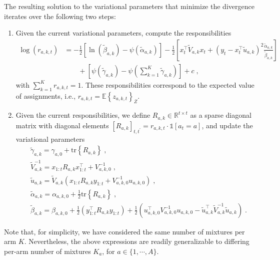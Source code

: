\documentclass{article}
\def \Real{{\mathbb R}}
\newcommand{\eValue}[1]{\mathbb{E}\left\{ #1 \right\}}
\newcommand{\ie}{i.e., }
\newcommand{\tr}[1]{\mathrm{tr}\left\{ #1 \right\}} %
\begin{document}
\pagebreak
The resulting solution to the variational parameters that minimize the divergence iterates over the following two steps:
\begin{enumerate}
	\item Given the current variational parameters, compute the responsibilities
		\begin{equation}
		\begin{split}
		\log (r_{a,k,t}) &= -\frac{1}{2} \left[\ln\left(\widetilde{\beta}_{a,k}\right) - \psi \left(\widetilde{\alpha}_{a,k}\right)\right] -\frac{1}{2} \left[x_t^\top \widetilde{V}_{a,k} x_t + (y_t-x_t^\top \widetilde{u}_{a,k})^2\frac{\widetilde{\alpha}_{a,k}}{\widetilde{\beta}_{a,k}}\right] \\
		& \qquad  + \left[\psi(\widetilde{\gamma}_{a,k})- \psi\left(\sum_{k=1}^K\widetilde{\gamma}_{a,k}\right)\right] + c \;,
		\end{split}
		\end{equation}
		with $\sum_{k=1}^K r_{a,k,t} = 1$. These responsibilities correspond to the expected value of assignments, \ie $r_{a,k,t}=\eValue{z_{a,k,t}}_{Z}$.
	\item Given the current responsibilities, we define $R_{a,k}\in\Real^{t\times t}$ as a sparse diagonal matrix with diagonal elements $\left[R_{a,k}\right]_{t,t^\prime}=r_{a,k,t} \cdot \mathds{1}[a_t=a]$, and update the variational parameters
		\begin{equation}
		\begin{split}
		&\widetilde{\gamma}_{a,k}=\gamma_{a,0} + \tr{R_{a,k}} \;, \\
		&\widetilde{V}_{a,k}^{-1} = x_{1:t} R_{a,k} x_{1:t}^\top + V_{a,k,0}^{-1} \;,\\
		&\widetilde{u}_{a,k}= \widetilde{V}_{a,k} \left( x_{1:t} R_{a,k} y_{1:t} + V_{a,k,0}^{-1} u_{a,k,0}\right) \;, \\
		&\widetilde{\alpha}_{a,k} = \alpha_{a,k,0} + \frac{1}{2} \tr{R_{a,k}} \;, \\
		&\widetilde{\beta}_{a,k} = \beta_{a,k,0} + \frac{1}{2}\left(y_{1:t}^\top R_{a,k}y_{1:t} \right) + \frac{1}{2}\left( u_{a,k,0}^\top V_{a,k,0}^{-1} u_{a,k,0} - \widetilde{u}_{a,k}^\top \widetilde{V}_{a,k}^{-1} \widetilde{u}_{a,k} \right) \; .
		\end{split}
		\end{equation}
\end{enumerate}

Note that, for simplicity, we have considered the same number of mixtures per arm $K$. Nevertheless, the above expressions are readily generalizable to differing per-arm number of mixtures $K_a$, for $a\in\{1, \cdots, A\}$.
\end{document}
